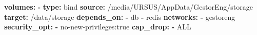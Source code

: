 \documentclass[
  10pt,
]{article}
\newenvironment{Shaded}{\begin{snugshade}}{\end{snugshade}}
\newcommand{\AttributeTok}[1]{\textcolor[rgb]{0.13,0.29,0.53}{#1}}
\newcommand{\FunctionTok}[1]{\textcolor[rgb]{0.13,0.29,0.53}{\textbf{#1}}}
\newcommand{\KeywordTok}[1]{\textcolor[rgb]{0.13,0.29,0.53}{\textbf{#1}}}
\begin{document}
\begin{Shaded}
\begin{Highlighting}[]
\AttributeTok{    }\FunctionTok{volumes}\KeywordTok{:}
\AttributeTok{      }\KeywordTok{{-}}\AttributeTok{ }\FunctionTok{type}\KeywordTok{:}\AttributeTok{ bind}
\AttributeTok{        }\FunctionTok{source}\KeywordTok{:}\AttributeTok{ /media/URSUS/AppData/GestorEng/storage}
\AttributeTok{        }\FunctionTok{target}\KeywordTok{:}\AttributeTok{ /data/storage}
\AttributeTok{    }\FunctionTok{depends\_on}\KeywordTok{:}
\AttributeTok{      }\KeywordTok{{-}}\AttributeTok{ db}
\AttributeTok{      }\KeywordTok{{-}}\AttributeTok{ redis}
\AttributeTok{    }\FunctionTok{networks}\KeywordTok{:}
\AttributeTok{      }\KeywordTok{{-}}\AttributeTok{ gestoreng}
\AttributeTok{    }\FunctionTok{security\_opt}\KeywordTok{:}
\AttributeTok{      }\KeywordTok{{-}}\AttributeTok{ no{-}new{-}privileges:true}
\AttributeTok{    }\FunctionTok{cap\_drop}\KeywordTok{:}
\AttributeTok{      }\KeywordTok{{-}}\AttributeTok{ ALL}


\end{Highlighting}
\end{Shaded}
\end{document}
